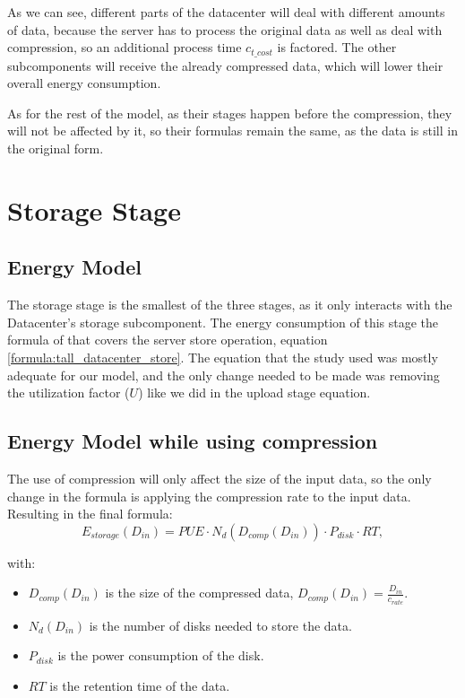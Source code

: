     As we can see, different parts of the datacenter will deal with different amounts of data, because the server has to process the original data as well as deal with compression, so an additional process time $c_{{t\_cost}}$ is factored.
    The other subcomponents will receive the already compressed data, which will lower their overall energy consumption.

    As for the rest of the model, as their stages happen before the compression, they will not be affected by it, so their formulas remain the same, as the data is still in the original form.

\section{Storage Stage}

\subsection{Energy Model}
    The storage stage is the smallest of the three stages, as it only interacts with the Datacenter's storage subcomponent. The energy consumption of this stage the formula of \citet{Taal2014} that covers the server store operation, equation \ref{formula:tall_datacenter_store}. The equation that the study used was mostly adequate for our model, and the only change needed to be made was removing the utilization factor ($U$) like we did in the upload stage equation.

\subsection{Energy Model while using compression}

    The use of compression will only affect the size of the input data, so the only change in the formula is applying the compression rate to the input data.
    Resulting in the final formula:
    \begin{equation}
        \label{formula:storage_stage}
        E_{storage}(D_{in}) = PUE \cdot N_d(D_{comp}(D_{in})) \cdot P_{disk} \cdot RT,
    \end{equation}

    \noindent with:
    \begin{itemize}
        \item $D_{comp}(D_{in})$ is the size of the compressed data, $D_{comp}(D_{in}) = \frac{D_{in}}{c_{rate}}$.
        \item $N_d(D_{in})$ is the number of disks needed to store the data.
        \item $P_{disk}$ is the power consumption of the disk.
        \item $RT$ is the retention time of the data.
    \end{itemize}

